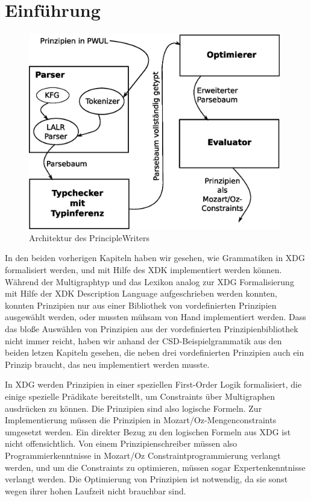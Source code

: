 \section{Einf\"uhrung}

\begin{figure}[ht!]
\begin{center}
\includegraphics[width=11cm]{eps/PW_Arch.eps}
\end{center}
\caption{Architektur des PrincipleWriters}
\label{archpw}
\end{figure}

In den beiden vorherigen Kapiteln haben wir gesehen, wie Grammatiken
in XDG formalisiert werden, und mit Hilfe des XDK implementiert werden
k\"onnen. W\"ahrend der Multigraphtyp und das Lexikon analog zur XDG
Formalisierung mit Hilfe der XDK Description Language aufgeschrieben
werden konnten, konnten Prinzipien nur aus einer Bibliothek von
vordefinierten Prinzipien ausgew\"ahlt werden, oder mussten m\"uhsam
von Hand implementiert werden. Dass das blo{\ss}e Ausw\"ahlen von
Prinzipien aus der vordefinierten Prinzipienbibliothek nicht immer
reicht, haben wir anhand der CSD-Beispielgrammatik aus den beiden
letzen Kapiteln gesehen, die neben drei vordefinierten Prinzipien auch
ein Prinzip braucht, das neu implementiert werden musste. %

In XDG werden Prinzipien in einer speziellen First-Order Logik
formalisiert, die einige spezielle Pr\"adikate bereitstellt, um
Constraints \"uber Multigraphen ausdr\"ucken zu k\"onnen.  Die
Prinzipien sind also logische Formeln. Zur Implementierung m\"ussen
die Prinzipien in Mozart/Oz-Mengenconstraints umgesetzt werden.  Ein
direkter Bezug zu den logischen Formeln aus XDG ist nicht
offensichtlich. Von einem Prinzipienschreiber m\"ussen also
Programmierkenntnisse in Mozart/Oz Constraintprogrammierung verlangt
werden, und um die Constraints zu optimieren, m\"ussen sogar
Expertenkenntnisse verlangt werden. Die Optimierung von Prinzipien ist
notwendig, da sie sonst wegen ihrer hohen Laufzeit nicht brauchbar
sind.

